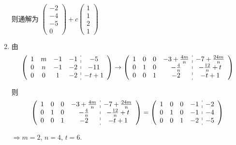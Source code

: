 \begin{enumerate}
                   则通解为 \( \begin{pmatrix}
                       -2 \\
                       -4 \\
                       -5 \\
                       0
                   \end{pmatrix} + c\begin{pmatrix}
                       1 \\
                       1 \\
                       2 \\
                       1
                   \end{pmatrix} \)
             \item %
                   由 \[ \left(\begin{array}{cccc:c}
                               1 & m & -1 & -1 & -5   \\
                               0 & n & -1 & -2 & -11  \\
                               0 & 0 & 1  & -2 & -t+1
                           \end{array}\right)
                       \rightarrow
                       \left(\begin{array}{cccc:c}
                               1 & 0 & 0 & -3+\frac{4m}{n} & -7+\frac{24m}{n} \\
                               0 & 1 & 0 & -\frac{4}{n}    & -\frac{12}{n}+t  \\
                               0 & 0 & 1 & -2              & -t+1
                           \end{array}\right) \]

                   则 \[ \left(\begin{array}{cccc:c}
                               1 & 0 & 0 & -3+\frac{4m}{n} & -7+\frac{24m}{n} \\
                               0 & 1 & 0 & -\frac{4}{n}    & -\frac{12}{n}+t  \\
                               0 & 0 & 1 & -2              & -t+1
                           \end{array}\right) =
                       \left(\begin{array}{cccc:c}
                               1 & 0 & 0 & -1 & -2 \\
                               0 & 1 & 0 & -1 & -4 \\
                               0 & 0 & 1 & -2 & -5
                           \end{array} \right) \]

                   \( \Rightarrow m = 2 \), \( n = 4 \), \( t = 6 \).
         \end{enumerate}



